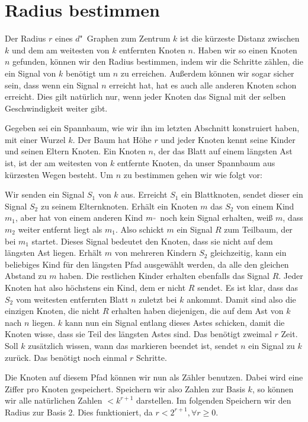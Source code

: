 \documentclass[11pt]{article}
\begin{document}
\section{Radius bestimmen}
Der Radius $r$ eines $d$"~Graphen zum Zentrum $k$ ist die kürzeste Distanz zwischen $k$ und dem am weitesten von $k$ entfernten Knoten $n$. 
Haben wir so einen Knoten $n$ gefunden, können wir den Radius bestimmen, indem wir die Schritte zählen, die ein Signal von $k$ benötigt um $n$ zu erreichen. 
Außerdem können wir sogar sicher sein, dass wenn ein Signal $n$ erreicht hat, hat es auch alle anderen Knoten schon erreicht. 
Dies gilt natürlich nur, wenn jeder Knoten das Signal mit der selben Geschwindigkeit weiter gibt.

Gegeben sei ein Spannbaum, wie wir ihn im letzten Abschnitt konstruiert haben, mit einer Wurzel $k$. 
Der Baum hat Höhe $r$ und jeder Knoten kennt seine Kinder und seinen Eltern Knoten. 
Ein Knoten $n$, der das Blatt auf einem längsten Ast ist, ist der am weitesten von $k$ entfernte Knoten, da unser Spannbaum aus kürzesten Wegen besteht. 
Um $n$ zu bestimmen gehen wir wie folgt vor:

Wir senden ein Signal $S_1$ von $k$ aus. Erreicht $S_1$ ein Blattknoten, sendet dieser ein Signal $S_2$ zu seinem Elternknoten. Erhält ein Knoten $m$ das $S_2$ von einem Kind $m_1$, aber hat von einem anderen Kind $m_"$ noch kein Signal erhalten, weiß $m$, dass $m_2$ weiter entfernt liegt als $m_1$. 
Also schickt $m$ ein Signal $R$ zum Teilbaum, der bei $m_1$ startet. Dieses Signal bedeutet den Knoten, dass sie nicht auf dem längsten Ast liegen. 
Erhält $m$  von mehreren Kindern $S_2$ gleichzeitig, kann ein beliebiges Kind für den längsten Pfad ausgewählt werden, da alle den gleichen Abstand zu $m$ haben. 
Die restlichen Kinder erhalten ebenfalls das Signal $R$. 
Jeder Knoten hat also höchstens ein Kind, dem er nicht $R$ sendet. 
Es ist klar, dass das $S_2$ vom weitesten entfernten Blatt $n$ zuletzt bei $k$ ankommt. 
Damit sind also die einzigen Knoten, die nicht $R$ erhalten haben diejenigen, die auf dem Ast von $k$ nach $n$ liegen.
$k$ kann nun ein Signal entlang dieses Astes schicken, damit die Knoten wisse, dass sie Teil des längsten Astes sind.
Das benötigt zweimal $r$ Zeit. Soll $k$ zusätzlich wissen, wann das markieren beendet ist, sendet $n$ ein Signal zu $k$ zurück. Das benötigt noch einmal $r$ Schritte.

Die Knoten auf diesem Pfad können wir nun als Zähler benutzen.
Dabei wird eine Ziffer pro Knoten gespeichert. Speichern wir also Zahlen zur Basis $k$, so können wir alle natürlichen Zahlen $< k^{r+1}$ darstellen. Im folgenden Speichern wir den Radius zur Basis 2. Dies funktioniert, da $r < 2^{r+1} , \forall r \geq 0$.
\end{document}
